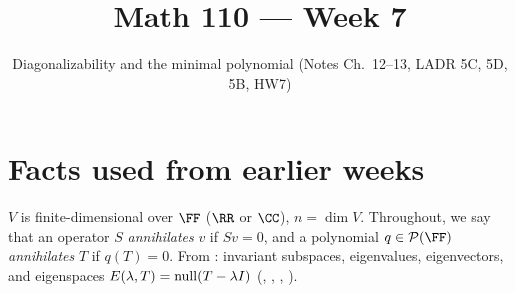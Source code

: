 \documentclass[10pt]{scrartcl}
\title{Math 110 --- Week 7}
\subtitle{Diagonalizability and the minimal polynomial (Notes Ch.~12--13, LADR 5C, 5D, 5B, HW7)}
\author{}\date{}\ihead{}
\begin{document}
\maketitle
\section{Facts used from earlier weeks}
$V$ is finite-dimensional over $\FF$ ($\RR$ or $\CC$), $n=\dim V$. Throughout, we say that an operator $S$ \emph{annihilates} $v$ if $Sv=0$, and a polynomial $q\in\PP(\FF)$ \emph{annihilates} $T$ if $q(T)=0$. From : invariant subspaces, eigenvalues, eigenvectors, and eigenspaces $E(\lambda,T)=\operatorname{null}(T-\lambda I)$ (, , , ).
\end{document}
